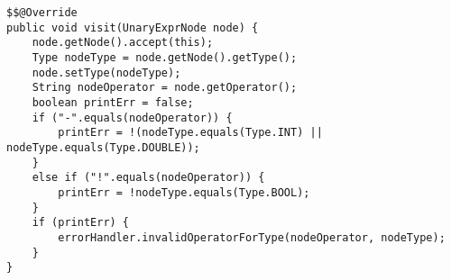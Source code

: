 \begin{lstlisting}[caption={Visit unary expression node}, label={code:TC:Unary}]
$$@Override
public void visit(UnaryExprNode node) {
    node.getNode().accept(this);
    Type nodeType = node.getNode().getType();
    node.setType(nodeType);
    String nodeOperator = node.getOperator();
    boolean printErr = false;
    if ("-".equals(nodeOperator)) {
        printErr = !(nodeType.equals(Type.INT) || nodeType.equals(Type.DOUBLE));
    } 
    else if ("!".equals(nodeOperator)) {
        printErr = !nodeType.equals(Type.BOOL);
    }
    if (printErr) {
        errorHandler.invalidOperatorForType(nodeOperator, nodeType);
    }
}
\end{lstlisting}